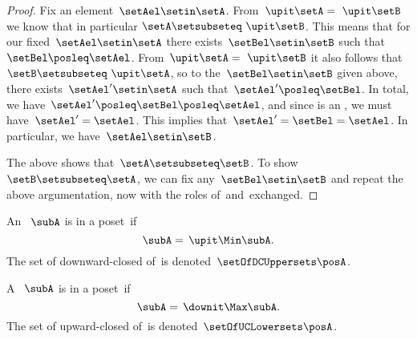 \begin{proof}
    Fix an element~$\setAel \setin \setA$.
    From~$\upit  \setA = \ \upit  \setB$ we know that in particular $\setA \setsubseteq \ \upit  \setB$.
    This means that for our fixed~$\setAel \setin \setA$ there exists~$\setBel \setin \setB$ such that~$\setBel \posleq \setAel$.
    From~$\upit \setA = \ \upit  \setB$ it also follows that~$\setB \setsubseteq \ \upit  \setA$, so to the~$\setBel \setin \setB$ given above, there exists~$\setAel' \setin \setA$ such that~$\setAel' \posleq \setBel$.
    In total, we have~$\setAel' \posleq \setBel \posleq \setAel$, and since \setA is an , we must have~$\setAel' = \setAel$.
    This implies that~$\setAel' = \setBel = \setAel$.
    In particular, we have~$\setAel \setin \setB$.

    The above shows that~$\setA \setsubseteq \setB$.
    To show~$\setB \setsubseteq \setA$, we can fix any~$\setBel \setin \setB$ and repeat the above argumentation, now with the roles of~\setA and~\setB exchanged.
\end{proof}

\begin{definition}
    \label{def:downward-closed-upperset}
    An ~$\subA$ is  in a poset~\posA if
    \begin{equation}
        \subA =\, \upit  \Min \subA.
    \end{equation}
    The set of downward-closed  of~\posA is denoted~$\setOfDCUppersets \posA$.

\end{definition}

\begin{definition}
    \label{def:upward-closed-lowerset}
    A ~$\subA$ is  in a poset~\posA if
    \begin{equation}
        \subA =\, \downit  \Max \subA.
    \end{equation}
    The set of upward-closed  of~\posA is denoted~$\setOfUCLowersets \posA$.
\end{definition}
